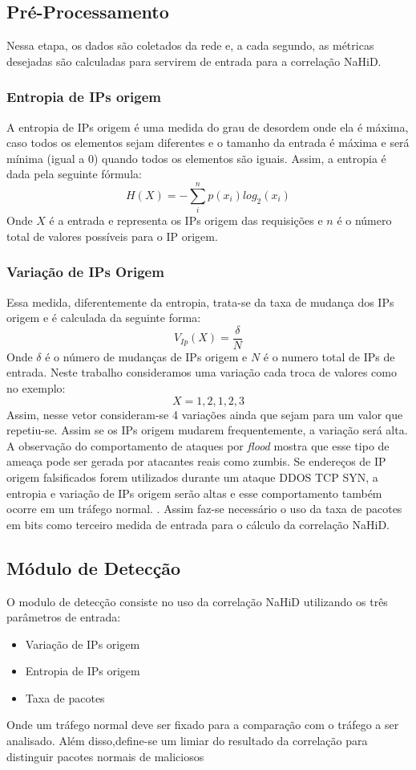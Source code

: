 \subsection{Pré-Processamento}
Nessa etapa, os dados são coletados da rede e, a cada segundo, as métricas desejadas são calculadas para servirem de entrada para a correlação NaHiD. 
\subsubsection{Entropia de IPs origem}
A entropia de IPs origem é uma medida do grau de desordem onde ela é máxima, caso todos os elementos sejam diferentes e o tamanho da entrada é máxima e será mínima (igual a 0) quando todos os elementos são iguais. Assim, a entropia é dada pela seguinte fórmula:
\begin{equation}
H(X) = - \sum_{i}^{n}p(x_i)log_2(x_i)
\end{equation}
Onde $X$ é a entrada e representa os IPs origem das requisições e $n$ é o número total de valores possíveis para o IP origem.  
\subsubsection{Variação de IPs Origem}
Essa medida, diferentemente da entropia, trata-se da taxa de mudança dos IPs origem e é calculada da seguinte forma:
\begin{equation}
	V_{Ip}(X) = \frac{\delta}{N}
\end{equation}
Onde $\delta$ é o número de mudanças de IPs origem e $N$ é o numero total de IPs de entrada. Neste trabalho consideramos uma variação cada troca de valores como no exemplo:
\begin{equation}
	X = {1,2,1,2,3}
\end{equation}
Assim, nesse vetor consideram-se 4 variações ainda que sejam para um valor que repetiu-se. Assim se os IPs origem mudarem frequentemente, a variação será alta. \cite{HOQUE201748}
\\
A observação do comportamento de ataques por \textit{flood} mostra que esse tipo de ameaça pode ser gerada por atacantes reais como zumbis. Se endereços de IP origem falsificados forem utilizados durante um ataque DDOS TCP SYN, a entropia e variação de IPs origem serão altas e esse comportamento também ocorre em um tráfego normal. \cite{HOQUE201748}. Assim faz-se necessário o uso da taxa de pacotes em bits como terceiro medida de entrada para o cálculo da correlação NaHiD.

\subsection{Módulo de Detecção}
O modulo de detecção consiste no uso da correlação NaHiD utilizando os três parâmetros de entrada:
\begin{itemize}
	\item Variação de IPs origem
	\item Entropia de IPs origem
	\item Taxa de pacotes
\end{itemize}
Onde um tráfego normal deve ser fixado para a comparação com o tráfego a ser analisado. Além disso,define-se um limiar do resultado da correlação para distinguir pacotes normais de maliciosos 
